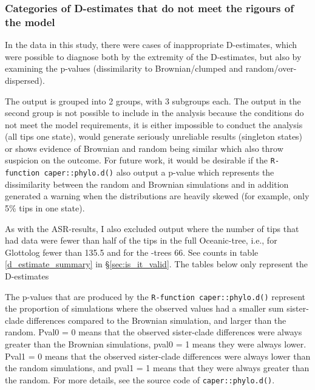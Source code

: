\documentclass[12pt,letterpaper]{article}
\begin{document}
\subsubsection{Categories of D-estimates that do not meet the rigours of the model}
\label{sec:d_estimate_summaries}
In the data in this study, there were cases of inappropriate D-estimates, which were possible to diagnose both by the extremity of the D-estimates, but also by examining the p-values (dissimilarity to Brownian/clumped and random/over-dispersed). 

The output is grouped into 2 groups, with 3 subgroups each. The output in the second group is not possible to include in the analysis because the conditions do not meet the model requirements, it is either impossible to conduct the analysis (all tips one state), would generate seriously unreliable results (singleton states) or shows evidence of Brownian and random being similar which also throw suspicion on the outcome. For future work, it would be desirable if the \texttt{R-function caper::phylo.d()} also output a p-value which represents the dissimilarity between the random and Brownian simulations and in addition generated a warning when the distributions are heavily skewed (for example, only 5\% tips in one state). 

As with the ASR-results, I also excluded output where the number of tips that had data were fewer than half of the tips in the full Oceanic-tree, i.e., for Glottolog fewer than 135.5 and for the \cite{grayetal_2009}-trees 66. See counts in table \ref{d_estimate_summary} in §\ref{sec:is_it_valid}. The tables below only represent the D-estimates 

The p-values that are produced by the \texttt{R-function caper::phylo.d()} represent the proportion of simulations where the observed values had a smaller sum sister-clade differences compared to the Brownian simulation, and larger than the random. Pval0 = 0 means that the observed sister-clade differences were always greater than the Brownian simulations, pval0 = 1 means they were always lower. Pval1 = 0 means that the observed sister-clade differences were always lower than the random simulations, and pval1 = 1 means that they were always greater than the random.  For more details, see the source code of \texttt{caper::phylo.d()}.
\end{document}
